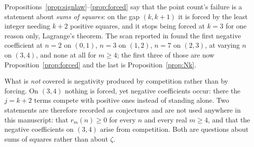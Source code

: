 \begin{remark}\label{rem:lagrange}
Propositions~\ref{prop:signlaw}--\ref{prop:forced} say that the point count's
failure is a statement about \emph{sums of squares}: on the gap $(k,k+1)$ it is
forced by the least integer needing $k+2$ positive squares, and it stops being
forced at $k=3$ for one reason only, Lagrange's theorem. The scan reported in
\cite{RankNote} found the first negative coefficient at $n=2$ on $(0,1)$, $n=3$
on $(1,2)$, $n=7$ on $(2,3)$, at varying $n$ on $(3,4)$, and none at all for
$m\ge4$; the first three of those are now Proposition~\ref{prop:forced} and the
last is Proposition~\ref{prop:Nk}.

What is \emph{not} covered is negativity produced by competition rather than by
forcing. On $(3,4)$ nothing is forced, yet negative coefficients occur: there the
$j=k+2$ terms compete with positive ones instead of standing alone. Two
statements are therefore recorded as conjectures and are not used anywhere in
this manuscript: that $r_m(n)\ge0$ for every $n$ and every real $m\ge4$, and that
the negative coefficients on $(3,4)$ arise from competition. Both are questions
about sums of squares rather than about $\zeta$.
\end{remark}
